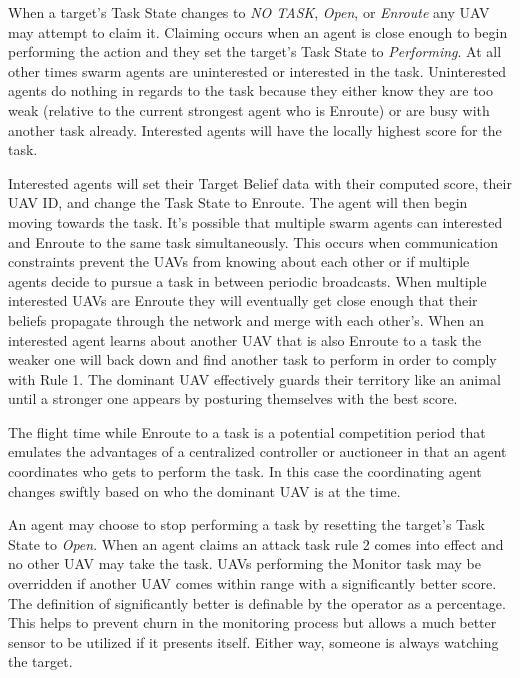 When a target's Task State changes to \textit{NO TASK}, \textit{Open}, or \textit{Enroute} any UAV may attempt to claim it.  Claiming occurs when an agent is close enough to begin performing the action and they set the target's Task State to \textit{Performing}.  At all other times swarm agents are uninterested or interested in the task.  Uninterested agents do nothing in regards to the task because they either know they are too weak (relative to the current strongest agent who is Enroute) or are busy with another task already.  Interested agents will have the locally highest score for the task.  

Interested agents will set their Target Belief data with their computed score, their UAV ID, and change the Task State to Enroute.  The agent will then begin moving towards the task.  It's possible that multiple swarm agents can interested and Enroute to the same task simultaneously.  This occurs when communication constraints prevent the UAVs from knowing about each other or if multiple agents decide to pursue a task in between periodic broadcasts.  When multiple interested UAVs are Enroute they will eventually get close enough that their beliefs propagate through the network and merge with each other's.  When an interested agent learns about another UAV that is also Enroute to a task the weaker one will back down and find another task to perform in order to comply with Rule 1.  The dominant UAV effectively guards their territory like an animal until a stronger one appears by posturing themselves with the best score.

The flight time while Enroute to a task is a potential competition period that emulates the advantages of a centralized controller or auctioneer in that an agent coordinates who gets to perform the task.  In this case the coordinating agent changes swiftly based on who the dominant UAV is at the time.

An agent may choose to stop performing a task by resetting the target's Task State to \textit{Open}.  When an agent claims an attack task rule 2 comes into effect and no other UAV may take the task.  UAVs performing the Monitor task may be overridden if another UAV comes within range with a significantly better score.  The definition of significantly better is definable by the operator as a percentage.   This helps to prevent churn in the monitoring process but allows a much better sensor to be utilized if it presents itself.  Either way, someone is always watching the target.

